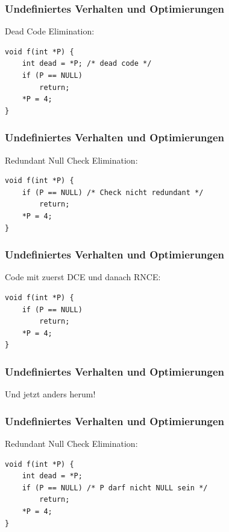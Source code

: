 \documentclass[12pt,compress]{beamer}
\begin{document}
\begin{frame}[fragile]
\frametitle{Undefiniertes Verhalten und Optimierungen}

Dead Code Elimination:

\vfill

\begin{lstlisting}
void f(int *P) {
    int dead = *P; /* dead code */
    if (P == NULL)
        return;
    *P = 4;
}
\end{lstlisting}
\end{frame}


\begin{frame}[fragile]
\frametitle{Undefiniertes Verhalten und Optimierungen}

Redundant Null Check Elimination:

\vfill

\begin{lstlisting}
void f(int *P) {
    if (P == NULL) /* Check nicht redundant */
        return;
    *P = 4;
}
\end{lstlisting}
\end{frame}


\begin{frame}[fragile]
\frametitle{Undefiniertes Verhalten und Optimierungen}

Code mit zuerst DCE und danach RNCE:

\vfill

\begin{lstlisting}
void f(int *P) {
    if (P == NULL)
        return;
    *P = 4;
}
\end{lstlisting}
\end{frame}


\begin{frame}[fragile]
\frametitle{Undefiniertes Verhalten und Optimierungen}

\begin{center}
Und jetzt anders herum!
\end{center}

\end{frame}


\begin{frame}[fragile]
\frametitle{Undefiniertes Verhalten und Optimierungen}

Redundant Null Check Elimination:

\vfill

\begin{lstlisting}
void f(int *P) {
    int dead = *P;
    if (P == NULL) /* P darf nicht NULL sein */
        return;
    *P = 4;
}
\end{lstlisting}
\end{frame}
\end{document}

